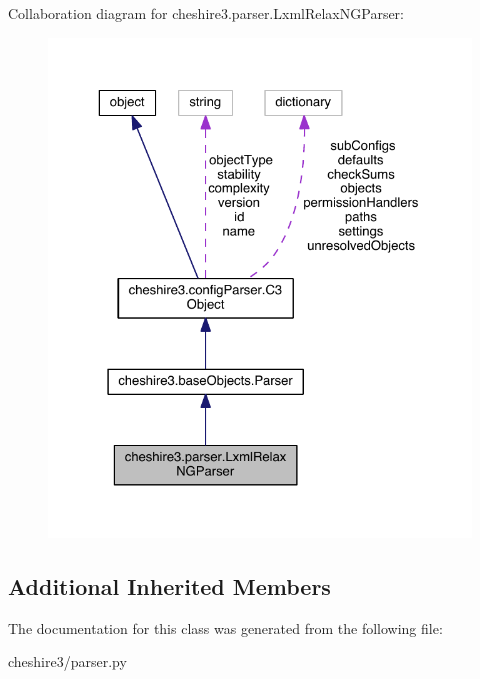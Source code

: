 Collaboration diagram for cheshire3.\-parser.\-Lxml\-Relax\-N\-G\-Parser\-:
\nopagebreak
\begin{figure}[H]
\begin{center}
\leavevmode
\includegraphics[width=325pt]{classcheshire3_1_1parser_1_1_lxml_relax_n_g_parser__coll__graph}
\end{center}
\end{figure}
\subsection*{Additional Inherited Members}


The documentation for this class was generated from the following file\-:\begin{DoxyCompactItemize}
\item 
cheshire3/parser.\-py\end{DoxyCompactItemize}
